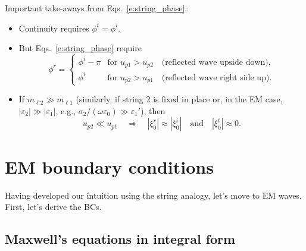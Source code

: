 \documentclass[11pt, oneside]{article}
\begin{document}
Important take-aways from Eqs.~\eqref{e:string_phase}:
\begin{itemize}
	\item Continuity requires $\phi^t = \phi^i$.
	\item But Eqs.~\eqref{e:string_phase} require
	\begin{equation}
		\phi^r =
		\begin{cases}
			\phi^i - \pi & \text{for } u_{p1} > u_{p2} \quad \text{(reflected wave upside down)},\\
			\phi^i & \text{for } u_{p2} > u_{p1} \quad \text{(reflected wave right side up)}.
		\end{cases}
	\end{equation}
	\item If $m_{\ell 2} \gg m_{\ell 1}$ (similarly, if string 2 is fixed in place or, in the EM case, $|\varepsilon_2| \gg |\varepsilon_1|$, e.g., $\sigma_2/(\omega\varepsilon_0) \gg \varepsilon_1'$), then
	\begin{equation}
		u_{p2} \ll u_{p1} \quad\Rightarrow\quad |\xi_0^r| \approx |\xi_0^i| \quad \text{and} \quad |\xi_0^t| \approx 0.
	\end{equation}
\end{itemize}

\section{EM boundary conditions}

Having developed our intuition using the string analogy, let's move to EM waves. First, let's derive the BCs.

\subsection{Maxwell's equations in integral form}
\end{document}
